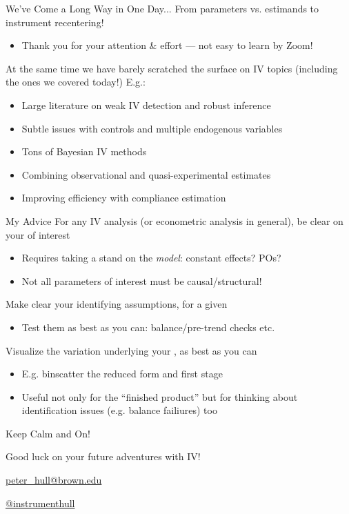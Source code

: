 \documentclass{beamer}
\begin{document}

\begin{frame}{We've Come a Long Way in One Day...}
From parameters vs. estimands to instrument recentering!\smallskip
\begin{itemize}
\item Thank you for your attention \& effort --- not easy to learn by Zoom! 
\end{itemize}\bigskip\pause{}

At the same time we have barely scratched the surface on IV topics (including the ones we covered today!) E.g.:\smallskip
\begin{itemize}
\item Large literature on weak IV detection and robust inference\smallskip
\item Subtle issues with controls and multiple endogenous variables\smallskip
\item Tons of Bayesian IV methods\smallskip
\item Combining observational and quasi-experimental estimates\smallskip
\item Improving efficiency with compliance estimation
\end{itemize}
\end{frame}

\begin{frame}{My Advice}
For any IV analysis (or econometric analysis in general), be clear on your  of interest\smallskip
\begin{itemize}
\item Requires taking a stand on the \emph{model}: constant effects? POs? \smallskip
\item Not all parameters of interest must be causal/structural!
\end{itemize}\medskip\pause{}

Make clear your identifying assumptions, for a given \smallskip
\begin{itemize}
\item Test them as best as you can: balance/pre-trend checks etc.
\end{itemize}\medskip\pause{}

Visualize the variation underlying your , as best as you can\smallskip
\begin{itemize}
\item E.g. binscatter the reduced form and first stage\smallskip
\item Useful not only for the ``finished product'' but for thinking about identification issues (e.g. balance failiures) too
\end{itemize}

\end{frame}

\begin{frame}{Keep Calm and  On!}

\begin{center}
Good luck on your future adventures with IV!

\bigskip
\url{peter_hull@brown.edu}

\bigskip
 \url{@instrumenthull}
\end{center}
\end{frame}
\end{document}
